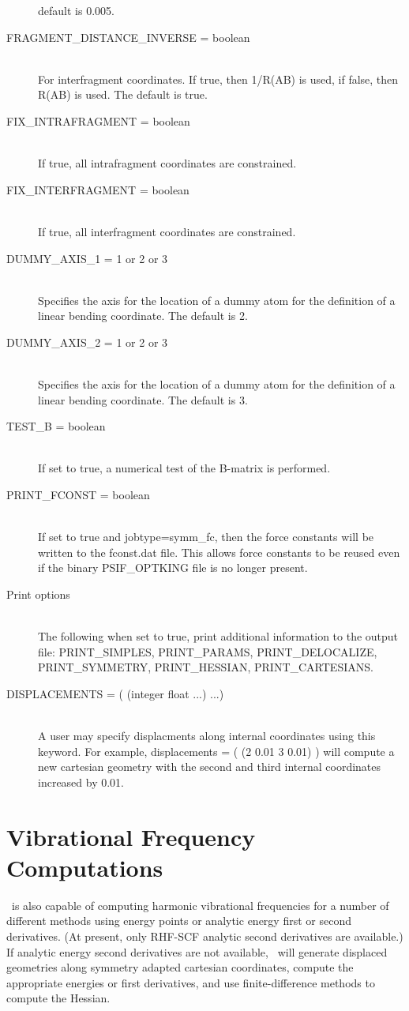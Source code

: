 \begin{description}
default is 0.005.
\item[FRAGMENT\_DISTANCE\_INVERSE = boolean]\mbox{}\\
For interfragment coordinates.  If true, then 1/R(AB) is used, if false,
then R(AB) is used.  The default is true.
\item[FIX\_INTRAFRAGMENT = boolean]\mbox{}\\
If true, all intrafragment coordinates are constrained.
\item[FIX\_INTERFRAGMENT = boolean]\mbox{}\\
If true, all interfragment coordinates are constrained.
\item[DUMMY\_AXIS\_1 = 1 or 2 or 3]\mbox{}\\
Specifies the axis for the location of a dummy atom for the definition
of a linear bending coordinate.  The default is 2.
\item[DUMMY\_AXIS\_2 = 1 or 2 or 3]\mbox{}\\
Specifies the axis for the location of a dummy atom for the definition
of a linear bending coordinate.  The default is 3.
\item[TEST\_B = boolean]\mbox{}\\
If set to true, a numerical test of the B-matrix is performed.
\item[PRINT\_FCONST = boolean]\mbox{}\\
If set to true and jobtype=symm\_fc, then the force constants will
be written to the fconst.dat file.  This allows force constants to be
reused even if the binary PSIF\_OPTKING file is no longer present.
\item[Print options]\mbox{}\\
The following when set to true, print additional information to the
output file: PRINT\_SIMPLES, PRINT\_PARAMS, PRINT\_DELOCALIZE,
PRINT\_SYMMETRY, PRINT\_HESSIAN, PRINT\_CARTESIANS.
\item[DISPLACEMENTS = ( (integer float ...) ...)]\mbox{}\\
A user may specify displacments along internal coordinates using this
keyword.  For example, displacements = ( (2 0.01 3 0.01) ) will compute
a new cartesian geometry with the second and third internal coordinates
increased by 0.01.
\end{description}


\section{Vibrational Frequency Computations} \label{freq}
\PSIthree\ is also capable of computing harmonic vibrational frequencies
for a number of different methods using energy points or analytic energy first or
second derivatives.  (At present, only RHF-SCF analytic second derivatives
are available.)  If analytic energy second derivatives are not available,
\PSIthree\ will generate displaced geometries along symmetry adapted cartesian
coordinates, compute the appropriate energies or first derivatives, and use
finite-difference methods to compute the Hessian.

